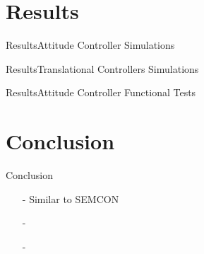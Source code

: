 \section{Results}
\begin{frame}{Results}{Attitude Controller Simulations}
    \begin{figure}[H]
    \end{figure}    
    \begin{figure}[H]
    \end{figure}    
\end{frame}

\begin{frame}{Results}{Translational Controllers Simulations}
    \begin{figure}[H]
    \end{figure}    
\end{frame}

\begin{frame}{Results}{Attitude Controller Functional Tests}
    \begin{figure}[H]
    \end{figure}    
    \begin{figure}[H]
    \end{figure}    
\end{frame}

\section{Conclusion}
\begin{frame}{Conclusion}{}
    \begin{itemize} 
        \item[-] Similar to SEMCON
        \item[-]
        \item[-]
    \end{itemize}   
\end{frame}